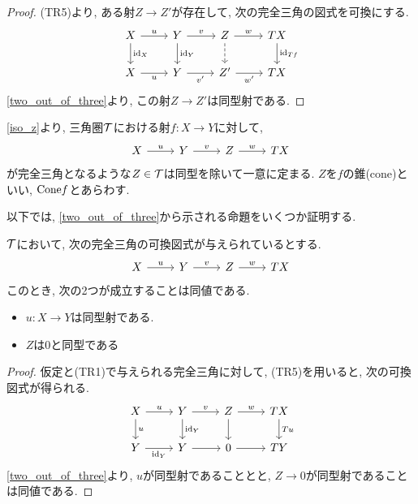 \documentclass[uplatex, a4paper, 14Q, dvipdfmx]{jsarticle}
\begin{document}
\begin{proof}
  (TR5)より, ある射$Z \to Z'$が存在して, 次の完全三角の図式を可換にする. 
  \[\begin{tikzcd}
    X & Y & Z & TX \\
    {X} & {Y} & {Z'} & {TX}
    \arrow["u", from=1-1, to=1-2]
    \arrow["v", from=1-2, to=1-3]
    \arrow["w", from=1-3, to=1-4]
    \arrow["{\id_X}", from=1-1, to=2-1]
    \arrow["{\id_Y}", from=1-2, to=2-2]
    \arrow[dashed, from=1-3, to=2-3]
    \arrow["{\id_{Tf}}", from=1-4, to=2-4]
    \arrow["{u}"', from=2-1, to=2-2]
    \arrow["{v'}"', from=2-2, to=2-3]
    \arrow["{w'}"', from=2-3, to=2-4]
  \end{tikzcd}\] 
  \cref{two_out_of_three}より, この射$Z \to Z'$は同型射である. 
\end{proof}

\begin{definition}[錐] \label{cone}
  \cref{iso_z}より, 三角圏$\mathcal{T}$における射$f: X \to Y$に対して, 
  \[\begin{tikzcd}
    X & Y & Z & TX
    \arrow["u", from=1-1, to=1-2]
    \arrow["v", from=1-2, to=1-3]
    \arrow["w", from=1-3, to=1-4]
  \end{tikzcd}\]
  が完全三角となるような$Z \in \mathcal{T}$は同型を除いて一意に定まる. 
  $Z$を$f$の錐(cone)といい, $\mathrm{Cone} f$とあらわす. 
\end{definition}

以下では, \cref{two_out_of_three}から示される命題をいくつか証明する. 

\begin{corollary}
  $\mathcal{T}$において, 次の完全三角の可換図式が与えられているとする. 
  \[\begin{tikzcd}
    X & Y & Z & TX
    \arrow["u", from=1-1, to=1-2]
    \arrow["v", from=1-2, to=1-3]
    \arrow["w", from=1-3, to=1-4]
  \end{tikzcd}\]
  このとき, 次の2つが成立することは同値である. 
  \begin{itemize}
    \item $u: X \to Y$は同型射である. 
    \item $Z$は$0$と同型である
  \end{itemize}
\end{corollary}

\begin{proof}
  仮定と(TR1)で与えられる完全三角に対して, (TR5)を用いると, 次の可換図式が得られる. 
  \[\begin{tikzcd}
    X & Y & Z & TX \\
    {Y} & {Y} & {0} & {TY}
    \arrow["u", from=1-1, to=1-2]
    \arrow["v", from=1-2, to=1-3]
    \arrow["w", from=1-3, to=1-4]
    \arrow["u", from=1-1, to=2-1]
    \arrow["{\id_Y}", from=1-2, to=2-2]
    \arrow[from=1-3, to=2-3]
    \arrow["{Tu}", from=1-4, to=2-4]
    \arrow["{\id_Y}"', from=2-1, to=2-2]
    \arrow[from=2-2, to=2-3]
    \arrow[from=2-3, to=2-4]
  \end{tikzcd}\] 
  \cref{two_out_of_three}より, $u$が同型射であることとと, $Z \to 0$が同型射であることは同値である. 
\end{proof}
\end{document}
